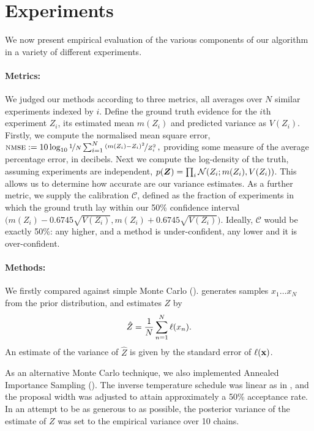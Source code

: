 \documentclass{article}
\begin{document}
\section{Experiments}
\label{sec:experiments}

We now present empirical evaluation of the various components of our algorithm in a variety of different experiments.

\paragraph{Metrics:} We judged our methods according to three metrics, all averages over $N$ similar experiments indexed by $i$. Define the ground truth evidence for the $i$th experiment $Z_i$, its estimated mean $m(Z_i)$ and predicted variance as $V(Z_i)$. Firstly, we compute the normalised mean square error,
$
\acro{nmse} \deq 10 \log_{10} \nicefrac{1}{N} \sum_{i=1}^{N} \nicefrac{(m(Z_i) - Z_i)^2}{Z_i^2}\,,
$
providing some measure of the average percentage error, in decibels. Next we compute the log-density of the truth, assuming experiments are independent,
$
p(\vect{Z}) = \prod_i \N{Z_i}{m(Z_i)}{V(Z_i)}
$. This allows us to determine how accurate are our variance estimates. As a further metric, we supply the calibration $\mathcal{C}$, defined as the fraction of experiments in which the ground truth lay within our 50\% confidence interval $\bigl(m(Z_i) - 0.6745 \sqrt{V(Z_i)}, m(Z_i) + 0.6745 \sqrt{V(Z_i)}\bigr)$. Ideally, $\mathcal{C}$ would be exactly 50\%: any higher, and a method is under-confident, any lower and it is over-confident. 

\paragraph{Methods:} We firstly compared against simple Monte Carlo ().  generates samples $x_1 \dots x_N$ from the prior distribution, and estimates $Z$ by $$\hat{Z} = \frac{1}{N} \sum_{n=1}^{N} \lfn(x_n).$$  An estimate of the variance of $\hat{Z}$ is given by the standard error of $\lfn({\bf x})$.

As an alternative Monte Carlo technique, we also implemented Annealed Importance Sampling ().  The inverse temperature schedule was linear as in \citep{BZMonteCarlo}, and the proposal width was adjusted to attain approximately a 50\% acceptance rate.  In an attempt to be as generous to  as possible, the posterior variance of the  estimate of $Z$ was set to the empirical variance over 10 chains.
\end{document}
